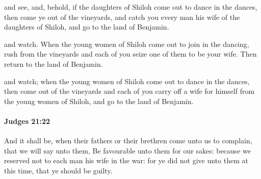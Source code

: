 			\begin{versebox}
					\item[BHS] 
					\item[ASV] and see, and, behold, if the daughters of Shiloh come out to dance in the dances, then come ye out of the vineyards, and catch you every man his wife of the daughters of Shiloh, and go to the land of Benjamin.
					\item[NIV] and watch. When the young women of Shiloh come out to join in the dancing, rush from the vineyards and each of you seize one of them to be your wife. Then return to the land of Benjamin.
					\item[NRSV] and watch; when the young women of Shiloh come out to dance in the dances, then come out of the vineyards and each of you carry off a wife for himself from the young women of Shiloh, and go to the land of Benjamin.
			\end{versebox}

		\paragraph{Judges 21:22} %
			\label{JUDGES-21-22}

			And it shall be, when their fathers or their brethren come unto us to complain, that we will say unto them, Be favourable unto them for our sakes: because we reserved not to each man his wife in the war: for ye did not give unto them at this time, that ye should be guilty.

